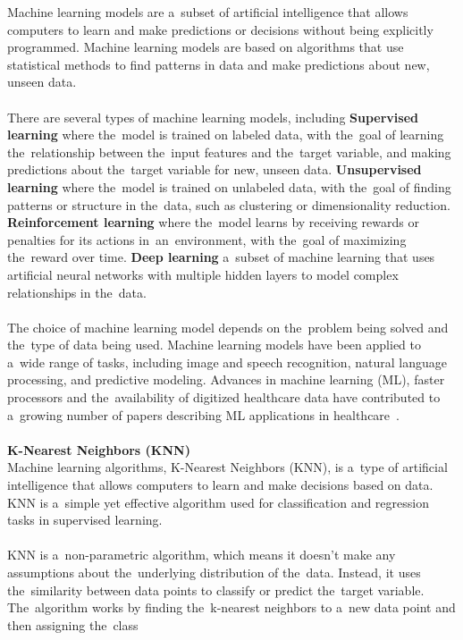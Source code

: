 \documentclass[12pt]{article}
\begin{document}
    Machine learning models are a~subset of artificial intelligence that allows computers to learn and make
predictions or decisions without being explicitly programmed. Machine learning models are based on algorithms
that use statistical methods to find patterns in data and make predictions about new, unseen data.\\
    \\
    There are several types of machine learning models, including \textbf{Supervised learning} where the~model is trained on labeled data, with the~goal of learning the~relationship between the~input features and the~target variable, and making predictions about the~target variable for new, unseen data.
\textbf{Unsupervised learning} where the~model is trained on unlabeled data, with the~goal of finding patterns or structure in the~data, such as clustering or dimensionality reduction. \textbf{Reinforcement learning} where the~model learns by receiving rewards or penalties for its actions in~an~environment, with the~goal of maximizing the~reward over time. \textbf{Deep learning} a~subset of machine learning that uses artificial neural networks with multiple hidden layers to model complex relationships in the~data.\\
    \\
    The choice of machine learning model depends on the~problem being solved and the~type of data being used. Machine learning models have been applied to a~wide range of tasks, including image and speech recognition, natural language processing, and predictive modeling. Advances in machine learning (ML), faster processors and the~availability of digitized healthcare data have contributed to a~growing number of papers describing ML applications in healthcare~\cite{Chen}.\\
    \\
    \noindent \textbf{K-Nearest Neighbors (KNN)} \label{sec:knn}\\
    Machine learning algorithms, K-Nearest Neighbors (KNN), is a~type of artificial intelligence that allows
computers to learn and make decisions based on data. KNN is a~simple yet effective algorithm used for
classification and regression tasks in supervised learning.\\
    \\
    KNN is a~non-parametric algorithm, which means it doesn't make any assumptions about the~underlying
distribution of the~data. Instead, it uses the~similarity between data points to classify or predict the~target
variable. The~algorithm works by finding the~k-nearest neighbors to a~new data point and then assigning the~class
\end{document}
